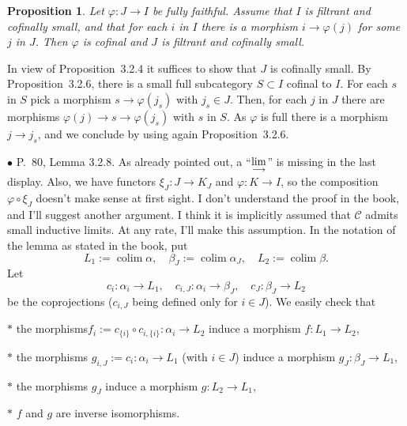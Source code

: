 \documentclass[12pt]{article}
\newtheorem{prop}[thm]{Proposition}
\theoremstyle{remark}%
\newcommand{\bu}{\bullet}
\newcommand{\n}{\noindent}
\newcommand{\C}{\mathcal C}
\newcommand{\p}{\varphi}
\newcommand{\pr}{Proposition}
\newcommand{\colim}{\operatornamewithlimits{\underset{\longrightarrow}{lim}}}
\DeclareMathOperator*{\coli}{colim}
\begin{document}
\begin{prop}\label{comb} 
Let $\p:J\to I$ be fully faithful. Assume that $I$ is filtrant and cofinally small, and that for each $i$ in $I$ there is a morphism $i\to\p(j)$ for some $j$ in $J$. Then $\p$ is cofinal and $J$ is filtrant and cofinally small. 
\end{prop} 

\n{\em Proof.} In view of \pr\ 3.2.4 it suffices to show that $J$ is cofinally small. By \pr\ 3.2.6, there is a small full subcategory $S\subset I$ cofinal to $I$. For each $s$ in $S$ pick a morphism $s\to\p(j_s)$ with $j_s\in J$. Then, for each $j$ in $J$ there are morphisms $\p(j)\to s\to\p(j_s)$ with $s$ in $S$. As $\p$ is full there is a morphism $j\to j_s$, and we conclude by using again \pr\ 3.2.6. 


\n$\bu$ P.~80, Lemma 3.2.8. As already pointed out, a ``$\displaystyle\colim$'' is missing in the last display. Also, we have functors $\xi_J:J\to K_J$ and $\varphi:K\to I$, so the composition $\varphi\circ\xi_J$ doesn't make sense at first sight. I don't understand the proof in the book, and I'll suggest another argument. I think it is implicitly assumed that $\C$ admits small inductive limits. At any rate, I'll make this assumption. In the notation of the lemma as stated in the book, put 
$$
L_1:=\coli\alpha,\quad
\beta_J:=\coli\alpha_J,\quad
L_2:=\coli\beta.
$$
Let 
$$
c_i:\alpha_i\to L_1,\quad 
c_{i,J}:\alpha_i\to\beta_J,\quad 
c_J:\beta_J\to L_2
$$
be the coprojections ($c_{i,J}$ being defined only for $i\in J$). We easily check that 

\n$*$ the morphisms$f_i:=c_{\{i\}}\circ c_{i,\{i\}}:\alpha_i\to L_2$ induce a morphism $f:L_1\to L_2$, 

\n$*$ the morphisms $g_{i,J}:=c_i:\alpha_i\to L_1$ (with $i\in J$) induce a morphism $g_J:\beta_J\to L_1$, 

\n$*$ the morphisms $g_J$ induce a morphism $g:L_2\to L_1$, 

\n$*$ $f$ and $g$ are inverse isomorphisms. 

\end{document}
